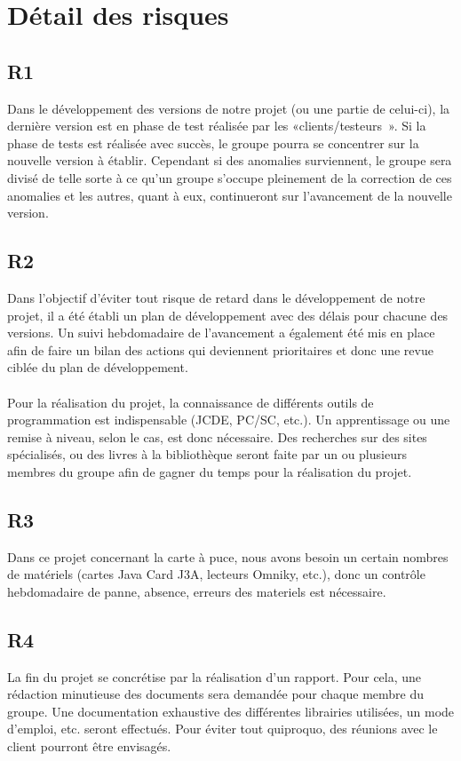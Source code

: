 \documentclass[a4paper,11pt,french]{article}
\begin{document}
\section{Détail des risques}

\subsection*{R1}
Dans le développement des versions de notre projet (ou une partie de celui-ci),
la dernière version est en phase de test réalisée par les «clients/testeurs ».
Si la phase de tests est réalisée avec succès, le groupe pourra se concentrer
sur la nouvelle version à établir. Cependant si des anomalies surviennent, le
groupe sera divisé de telle sorte à ce qu’un groupe s’occupe pleinement de la
correction de ces anomalies et les autres, quant à eux, continueront sur
l’avancement de la nouvelle version.

\subsection*{R2}
Dans l’objectif d’éviter tout risque de retard dans le développement de notre
projet, il a été établi un plan de développement avec des délais pour chacune
des versions. Un suivi hebdomadaire de l’avancement a également été mis en place
afin de faire un bilan des actions qui deviennent prioritaires et donc une revue
ciblée du plan de développement.
\paragraph{}
Pour la réalisation du projet, la connaissance de différents outils de
programmation est indispensable (JCDE, PC/SC, etc.). Un apprentissage ou
une remise à niveau, selon le cas, est donc nécessaire. Des recherches sur des
sites spécialisés, ou des livres à la bibliothèque seront faite par un ou
plusieurs membres du groupe afin de gagner du temps pour la réalisation du
projet.


\subsection*{R3}
Dans ce projet concernant la carte à puce, nous avons besoin un certain nombres 
de matériels (cartes Java Card J3A, lecteurs Omniky, etc.), donc un contrôle hebdomadaire 
de panne, absence, erreurs des materiels est nécessaire. 


\subsection*{R4}
La fin du projet se concrétise par la réalisation d’un rapport. Pour cela, une
rédaction minutieuse des documents sera demandée pour chaque membre du groupe.
Une documentation exhaustive des différentes librairies utilisées, un mode
d’emploi, etc. seront effectués. Pour éviter tout quiproquo, des réunions avec
le client pourront être envisagés.
\end{document}
